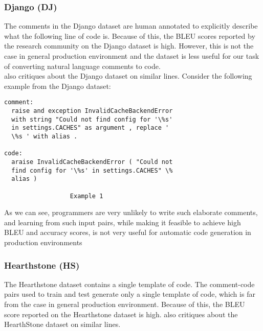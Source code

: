 \documentclass{IEEEtran}
\begin{document}
      \subsubsection{Django (DJ)}
      The comments in the Django dataset are human annotated to explicitly describe what 
      the following line of code is. Because of this, the BLEU scores reported by the 
      research community on the Django dataset is high. However, this is not the case in general 
      production environment and the dataset is less useful for our task of converting natural 
      language comments to code. \\
      \hspace*{4mm}\cite{barone2017} also critiques about the Django dataset on 
      similar lines.
      Consider the following example from the Django dataset:
      \begin{lstlisting}[frame=single,basicstyle=\small]
comment:
  raise and exception InvalidCacheBackendError 
  with string "Could not find config for '\%s' 
  in settings.CACHES" as argument , replace ' 
  \%s ' with alias .

code:
  araise InvalidCacheBackendError ( "Could not 
  find config for '\%s' in settings.CACHES" \% 
  alias )

                  Example 1
      \end{lstlisting}

      As we can see, programmers are very unlikely to write such elaborate comments, 
      and learning from such input pairs, while making it feasible to achieve high 
      BLEU and accuracy scores, is not very useful for automatic code generation  
      in production environments

      \subsubsection{Hearthstone (HS)}
The Hearthstone dataset contains a single template of code. The comment-code                                                                                      
        pairs used to train and test generate only a single template of code, which                                                                                        
        is far from the case in general production environment. Because of this,                                                                                          
        the BLEU score reported on the Hearthstone dataset is high.                                                                                        
        \cite{barone2017} also critiques about the HearthStone dataset on 
      similar lines.
\end{document}
